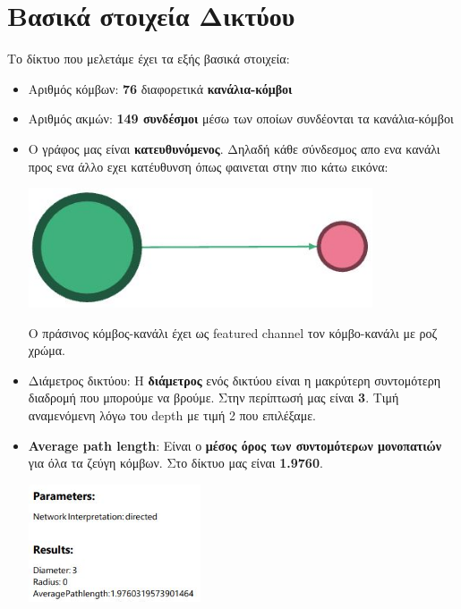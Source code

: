 \documentclass[12pt]{article}
\begin{document}
	\section{Βασικά στοιχεία Δικτύου}
	Το δίκτυο που μελετάμε έχει τα εξής βασικά στοιχεία:
	\begin{itemize}
		\item Αριθμός κόμβων: \textbf{76} διαφορετικά \textbf{κανάλια-κόμβοι}
		\item Αριθμός ακμών: \textbf{149 συνδέσμοι} μέσω των οποίων συνδέονται τα κανάλια-κόμβοι
		\item Ο γράφος μας είναι \textbf{κατευθυνόμενος}. Δηλαδή κάθε σύνδεσμος απο ενα κανάλι προς ενα άλλο εχει κατέυθυνση όπως φαινεται στην πιο κάτω εικόνα:
		\begin{center}
			\includegraphics[width=0.8\textwidth]{photos-files/section4/ate.JPG}
			
			Ο πράσινος κόμβος-κανάλι έχει ως featured channel τον κόμβο-κανάλι με ροζ χρώμα.
		\end{center}
		\item Διάμετρος δικτύου: Η \textbf{διάμετρος} ενός δικτύου είναι η μακρύτερη συντομότερη διαδρομή που μπορούμε να βρούμε. Στην περίπτωσή μας είναι \textbf{3}. Τιμή αναμενόμενη λόγω του depth με τιμή 2 που επιλέξαμε.
		\item \textbf{Average path length}: Είναι ο \textbf{μέσος όρος των συντομότερων μονοπατιών} για όλα τα ζεύγη κόμβων. Στο δίκτυο μας είναι \textbf{1.9760}.
		\begin{center}
			\includegraphics[width=0.4\textwidth]{photos-files/section4/graph_distance_report.JPG}
		\end{center}
	\end{itemize}
	\label{chap:basic_network_elements_4}
	
\end{document}

